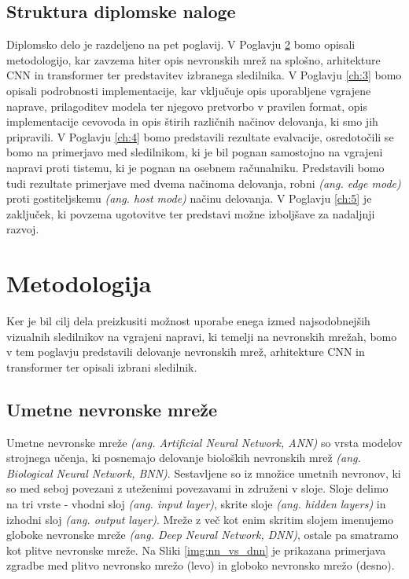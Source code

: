 \documentclass[a4paper,12pt,openright]{book}
\begin{document}
\section{Struktura diplomske naloge}
Diplomsko delo je razdeljeno na pet poglavij. V Poglavju \ref{ch:2} bomo opisali metodologijo, kar zavzema hiter opis nevronskih mrež na splošno, arhitekture CNN in transformer ter predstavitev izbranega sledilnika. V Poglavju \ref{ch:3} bomo opisali podrobnosti implementacije, kar vključuje opis uporabljene vgrajene naprave, prilagoditev modela ter njegovo pretvorbo v pravilen format, opis implementacije cevovoda in opis štirih različnih načinov delovanja, ki smo jih pripravili. V Poglavju \ref{ch:4} bomo predstavili rezultate evalvacije, osredotočili se bomo na primerjavo med sledilnikom, ki je bil pognan samostojno na vgrajeni napravi proti tistemu, ki je pognan na osebnem računalniku. Predstavili bomo tudi rezultate primerjave med dvema načinoma delovanja, robni \emph{(ang. edge mode)} proti gostiteljskemu \emph{(ang. host mode)} načinu delovanja. V Poglavju \ref{ch:5} je zaključek, ki povzema ugotovitve ter predstavi možne izboljšave za nadaljnji razvoj.


\chapter{Metodologija}
\label{ch:2}
Ker je bil cilj dela preizkusiti možnost uporabe enega izmed najsodobnejših vizualnih sledilnikov na vgrajeni napravi, ki temelji na nevronskih mrežah, bomo v tem poglavju predstavili delovanje nevronskih mrež, arhitekture CNN in transformer ter opisali izbrani sledilnik.

\section{Umetne nevronske mreže}
Umetne nevronske mreže \emph{(ang. Artificial Neural Network, ANN)} so vrsta modelov strojnega učenja, ki posnemajo delovanje bioloških nevronskih mrež \emph{(ang. Biological Neural Network, BNN)}. Sestavljene so iz množice umetnih nevronov, ki so med seboj povezani z uteženimi povezavami in združeni v sloje. Sloje delimo na tri vrste - vhodni sloj \emph{(ang. input layer)}, skrite sloje \emph{(ang. hidden layers)} in izhodni sloj \emph{(ang. output layer)}. Mreže z več kot enim skritim slojem imenujemo globoke nevronske mreže \emph{(ang. Deep Neural Network, DNN)}, ostale pa smatramo kot plitve nevronske mreže. Na Sliki \ref{img:nn_vs_dnn} je prikazana primerjava zgradbe med plitvo nevronsko mrežo (levo) in globoko nevronsko mrežo (desno).
\end{document}
